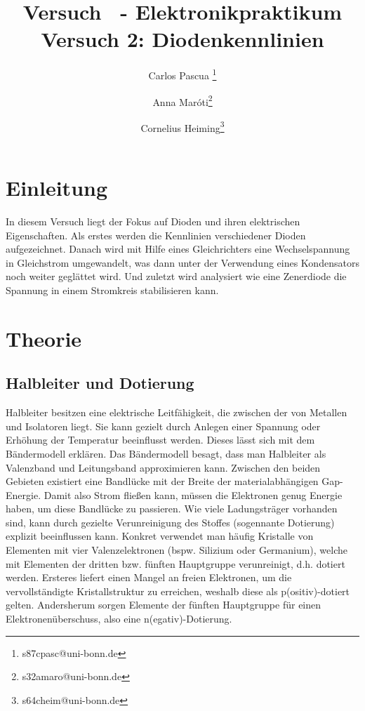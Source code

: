 \documentclass{article}
\title{Versuch \nummer~-  \titel}
\date{\datum}
\theoremstyle{definition}
\begin{document}
    \title{Elektronikpraktikum \\ \textbf{Versuch 2: Diodenkennlinien}}
    \author[1]{Carlos Pascua \thanks{s87cpasc@uni-bonn.de}}
    \author[1]{Anna Maróti\thanks{s32amaro@uni-bonn.de}}
    \author[1]{Cornelius Heiming\thanks{s64cheim@uni-bonn.de}}
    \begin{titlepage}
     \maketitle   
    \end{titlepage}
        
\tableofcontents
\newpage
{}

\pagestyle{fancy}
\fancyhead[R]{\thepage}
\fancyhead[L]{\leftmark}

\section{Einleitung}

In diesem Versuch liegt der Fokus auf Dioden und ihren elektrischen Eigenschaften. 
Als erstes werden die Kennlinien verschiedener Dioden aufgezeichnet. 
Danach wird mit Hilfe eines Gleichrichters eine Wechselspannung in Gleichstrom umgewandelt, 
was dann unter der Verwendung eines Kondensators noch weiter geglättet wird. 
Und zuletzt wird analysiert wie eine Zenerdiode die Spannung in einem Stromkreis stabilisieren kann.

\section{Theorie}
    \subsection{Halbleiter und Dotierung}
    Halbleiter besitzen eine elektrische Leitfähigkeit, die zwischen der von Metallen und Isolatoren
    liegt. Sie kann gezielt durch Anlegen einer Spannung oder Erhöhung der Temperatur beeinflusst
    werden. Dieses lässt sich mit dem Bändermodell erklären. Das Bändermodell besagt, dass man
    Halbleiter als Valenzband und Leitungsband approximieren kann. Zwischen den beiden Gebieten
    existiert eine Bandlücke mit der Breite der materialabhängigen Gap-Energie. Damit also Strom
    fließen kann, müssen die Elektronen genug Energie haben, um diese Bandlücke zu passieren.
    Wie viele Ladungsträger vorhanden sind, kann durch gezielte Verunreinigung des Stoffes (sogennante Dotierung) explizit beeinflussen kann. 
    Konkret verwendet man häufig Kristalle von Elementen mit vier Valenzelektronen (bspw. Silizium oder Germanium), welche mit Elementen der 
    dritten bzw. fünften Hauptgruppe verunreinigt, d.h. dotiert werden. Ersteres liefert einen Mangel an freien Elektronen, um die vervollständigte 
    Kristallstruktur zu erreichen, weshalb diese als p(ositiv)-dotiert gelten. Andersherum sorgen Elemente der fünften Hauptgruppe für einen Elektronenüberschuss,
     also eine n(egativ)-Dotierung.
\end{document}
